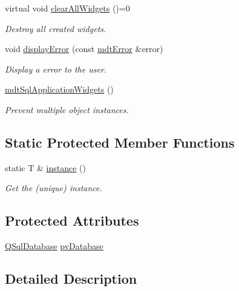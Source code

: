 \begin{DoxyCompactItemize}
virtual void \hyperlink{classmdt_sql_application_widgets_a3f321120a9845744f4baf0be027c4119}{clear\-All\-Widgets} ()=0
\begin{DoxyCompactList}\small\item\em Destroy all created widgets. \end{DoxyCompactList}\item 
void \hyperlink{classmdt_sql_application_widgets_a5b4b99fc3894e445e08a21b7c660485a}{display\-Error} (const \hyperlink{classmdt_error}{mdt\-Error} \&error)
\begin{DoxyCompactList}\small\item\em Display a error to the user. \end{DoxyCompactList}\item 
\hyperlink{classmdt_sql_application_widgets_a4716d909fb5a06bab56487624f00d733}{mdt\-Sql\-Application\-Widgets} ()
\begin{DoxyCompactList}\small\item\em Prevent multiple object instances. \end{DoxyCompactList}\end{DoxyCompactItemize}
\subsection*{Static Protected Member Functions}
\begin{DoxyCompactItemize}
\item 
static T \& \hyperlink{classmdt_sql_application_widgets_adcee3d0c9bfedcc22c4bf6af556dc402}{instance} ()
\begin{DoxyCompactList}\small\item\em Get the (unique) instance. \end{DoxyCompactList}\end{DoxyCompactItemize}
\subsection*{Protected Attributes}
\begin{DoxyCompactItemize}
\item 
\hyperlink{class_q_sql_database}{Q\-Sql\-Database} \hyperlink{classmdt_sql_application_widgets_ab837a76829e31f7d93d7cafce6d7d989}{pv\-Database}
\end{DoxyCompactItemize}


\subsection{Detailed Description}
